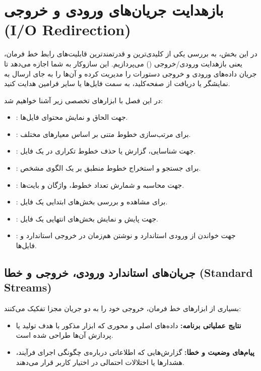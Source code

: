 \chapter{بازهدایت جریان‌های ورودی و خروجی (I/O Redirection)}

در این بخش، به بررسی یکی از کلیدی‌ترین و قدرتمندترین قابلیت‌های رابط خط فرمان، یعنی بازهدایت ورودی/خروجی () می‌پردازیم. این سازوکار به شما اجازه می‌دهد تا جریان داده‌های ورودی و خروجی دستورات را مدیریت کرده و آن‌ها را به جای ارسال به نمایشگر یا دریافت از صفحه‌کلید، به سمت فایل‌ها یا سایر فرامین هدایت کنید.

در این فصل با ابزارهای تخصصی زیر آشنا خواهیم شد:

\begin{itemize}
  \item {}: جهت الحاق و نمایش محتوای فایل‌ها.
  \item {}: برای مرتب‌سازی خطوط متنی بر اساس معیارهای مختلف.
  \item {}: جهت شناسایی، گزارش یا حذف خطوط تکراری در یک فایل.
  \item {}: برای جستجو و استخراج خطوط منطبق بر یک الگوی مشخص.
  \item {}: جهت محاسبه و شمارش تعداد خطوط، واژگان و بایت‌ها.
  \item {}: برای مشاهده و بررسی بخش‌های ابتدایی یک فایل.
  \item {}: جهت پایش و نمایش بخش‌های انتهایی یک فایل.
  \item {}: جهت خواندن از ورودی استاندارد و نوشتن هم‌زمان در خروجی استاندارد و فایل‌ها.
\end{itemize}

\section{جریان‌های استاندارد ورودی، خروجی و خطا (Standard Streams)}

بسیاری از ابزارهای خط فرمان، خروجی خود را به دو جریان مجزا تفکیک می‌کنند:

\begin{itemize}
  \item \textbf{نتایج عملیاتی برنامه:} داده‌های اصلی و محوری که ابزار مذکور با هدف تولید یا پردازش آن‌ها طراحی شده است.
  \item \textbf{پیام‌های وضعیت و خطا:} گزارش‌هایی که اطلاعاتی درباره‌ی چگونگی اجرای فرآیند، هشدارها یا اختلالات احتمالی در اختیار کاربر قرار می‌دهند.
\end{itemize}

